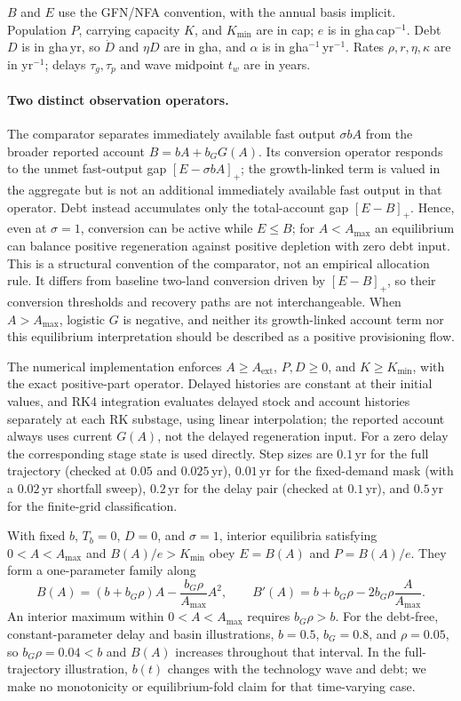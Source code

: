 \documentclass[11pt,a4paper]{article}
\begin{document}
$B$ and $E$ use the GFN/NFA convention, with the annual basis implicit. Population $P$, carrying capacity $K$, and $K_{\min}$ are in cap; $e$ is in gha\,cap$^{-1}$. Debt $D$ is in gha\,yr, so $\dot D$ and $\eta D$ are in gha, and $\alpha$ is in gha$^{-1}$\,yr$^{-1}$. Rates $\rho,r,\eta,\kappa$ are in yr$^{-1}$; delays $\tau_g,\tau_p$ and wave midpoint $t_w$ are in years.

\paragraph{Two distinct observation operators.} The comparator separates immediately available fast output $\sigma bA$ from the broader reported account $B=bA+b_GG(A)$. Its conversion operator responds to the unmet fast-output gap $[E-\sigma bA]_+$; the growth-linked term is valued in the aggregate but is not an additional immediately available fast output in that operator. Debt instead accumulates only the total-account gap $[E-B]_+$. Hence, even at $\sigma=1$, conversion can be active while $E\le B$; for $A<A_{\max}$ an equilibrium can balance positive regeneration against positive depletion with zero debt input. This is a structural convention of the comparator, not an empirical allocation rule. It differs from baseline two-land conversion driven by $[E-B]_+$, so their conversion thresholds and recovery paths are not interchangeable. When $A>A_{\max}$, logistic $G$ is negative, and neither its growth-linked account term nor this equilibrium interpretation should be described as a positive provisioning flow.

The numerical implementation enforces $A\ge A_{\mathrm{ext}}$, $P,D\ge0$, and $K\ge K_{\min}$, with the exact positive-part operator. Delayed histories are constant at their initial values, and RK4 integration evaluates delayed stock and account histories separately at each RK substage, using linear interpolation; the reported account always uses current $G(A)$, not the delayed regeneration input. For a zero delay the corresponding stage state is used directly. Step sizes are $0.1$\,yr for the full trajectory (checked at $0.05$ and $0.025$\,yr), $0.01$\,yr for the fixed-demand mask (with a $0.02$\,yr shortfall sweep), $0.2$\,yr for the delay pair (checked at $0.1$\,yr), and $0.5$\,yr for the finite-grid classification.

With fixed $b$, $T_b=0$, $D=0$, and $\sigma=1$, interior equilibria satisfying $0<A<A_{\max}$ and $B(A)/e>K_{\min}$ obey $E=B(A)$ and $P=B(A)/e$. They form a one-parameter family along
\[
B(A)=(b+b_G\rho)A-\frac{b_G\rho}{A_{\max}}A^2,\qquad
B'(A)=b+b_G\rho-2b_G\rho\frac{A}{A_{\max}}.
\]
An interior maximum within $0<A<A_{\max}$ requires $b_G\rho>b$. For the debt-free, constant-parameter delay and basin illustrations, $b=0.5$, $b_G=0.8$, and $\rho=0.05$, so $b_G\rho=0.04<b$ and $B(A)$ increases throughout that interval. In the full-trajectory illustration, $b(t)$ changes with the technology wave and debt; we make no monotonicity or equilibrium-fold claim for that time-varying case.
\end{document}
